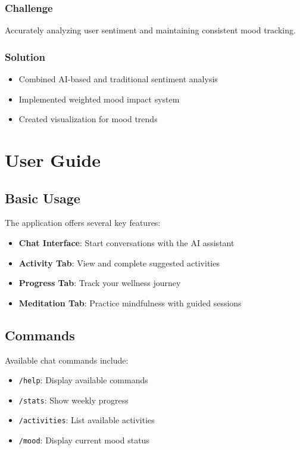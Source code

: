 \documentclass[12pt]{article}
\begin{document}
\subsubsection{Challenge}
Accurately analyzing user sentiment and maintaining consistent mood tracking.

\subsubsection{Solution}
\begin{itemize}
    \item Combined AI-based and traditional sentiment analysis
    \item Implemented weighted mood impact system
    \item Created visualization for mood trends
\end{itemize}

\section{User Guide}

\subsection{Basic Usage}
The application offers several key features:

\begin{itemize}
    \item \textbf{Chat Interface}: Start conversations with the AI assistant
    \item \textbf{Activity Tab}: View and complete suggested activities
    \item \textbf{Progress Tab}: Track your wellness journey
    \item \textbf{Meditation Tab}: Practice mindfulness with guided sessions
\end{itemize}

\subsection{Commands}
Available chat commands include:

\begin{itemize}
    \item \texttt{/help}: Display available commands
    \item \texttt{/stats}: Show weekly progress
    \item \texttt{/activities}: List available activities
    \item \texttt{/mood}: Display current mood status
\end{itemize}
\end{document}
